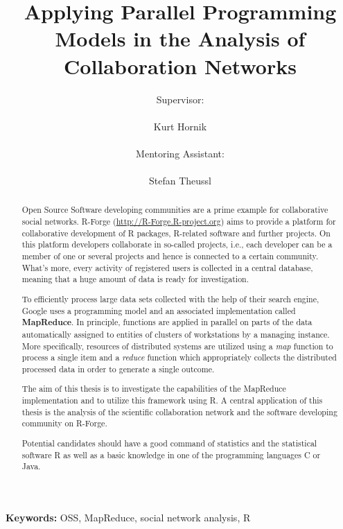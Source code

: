 \documentclass[a4paper]{article}
\author{Supervisor:\\\\Kurt Hornik\\\\Mentoring Assistant:\\\\ 
        Stefan Theussl}
\title{Applying Parallel Programming Models in the Analysis of
  Collaboration Networks}
\newcommand{\proglang}[1]{\textsf{#1}}
\begin{document}
\maketitle

\begin{abstract} Open Source Software developing communities are
  a prime example for collaborative social networks. R-Forge
  (\url{http://R-Forge.R-project.org}) aims to provide a platform for
  collaborative development of \proglang{R} packages,
  \proglang{R}-related software and further projects. On this platform
  developers collaborate in so-called projects, i.e., each developer
  can be a member of one or several projects and hence is
  connected to a certain community. What's more, every activity
  of registered users is collected in a central database, meaning that
  a huge amount of data is ready for investigation.  

  To efficiently process large data sets collected with the help of
  their search engine, Google uses a programming model and an
  associated implementation called \textbf{MapReduce}. In principle, functions
  are applied in parallel on parts of the data automatically assigned
  to entities of clusters of workstations by a managing instance. More
  specifically, 
  resources of distributed systems are utilized using a
  \textit{map} function to process a single item and a \textit{reduce}
  function which appropriately collects the distributed processed data
  in order to generate a single outcome.

  The aim of this thesis is to investigate the capabilities of the
  MapReduce implementation and to utilize this framework using
  \proglang{R}. A central application of this thesis is the analysis
  of the scientific collaboration network and the software developing
  community on R-Forge.

  Potential candidates should have a good command of statistics and
  the statistical software \proglang{R} as well as a basic knowledge in
  one of the programming languages \proglang{C} or \proglang{Java}.
\end{abstract}
\vspace{1cm}
\centering \textbf{Keywords:} OSS, MapReduce, social network analysis, \proglang{R}

%
%
%
\end{document}
